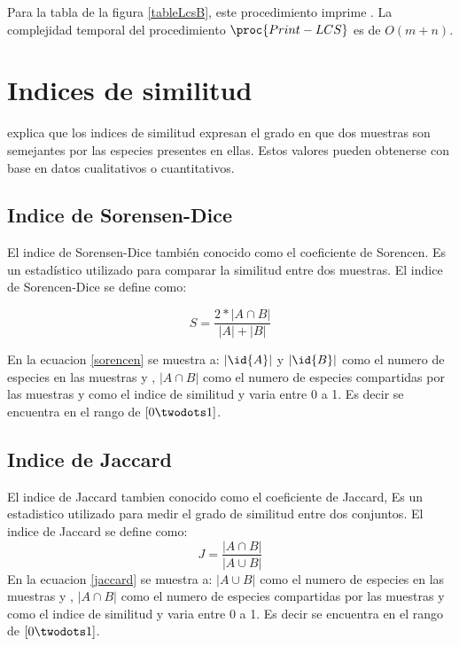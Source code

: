 

Para la tabla  de la figura \ref{tableLcsB}, este procedimiento imprime . La complejidad temporal del procedimiento $\proc{Print-LCS}$ es de $O(m + n)$.

\section{Indices de similitud}
\cite{magurran1988} explica que los indices de similitud expresan el grado en que dos muestras son semejantes por las especies presentes en ellas. Estos valores pueden obtenerse con base en datos cualitativos o cuantitativos.

\subsection{Indice de Sorensen-Dice}
El indice de Sorensen-Dice también conocido como el coeficiente de Sorencen. Es un estadístico utilizado para comparar la similitud entre dos muestras. El indice de Sorencen-Dice se define como:

\begin{equation}
S = \frac{2*|A \cap B|}{|A|+|B|}
\label{sorencen}
\end{equation}

En la ecuacion \ref{sorencen} se muestra a: $|\id{A}|$ y $|\id{B}|$ como el numero de especies en las muestras  y , $|A \cap B|$ como el numero de especies compartidas por las muestras y  como el indice de similitud y varia entre 0 a 1. Es decir se encuentra en el rango de $[0 \twodots 1]$.

\subsection{Indice de Jaccard}
El indice de Jaccard tambien conocido como el coeficiente de Jaccard, Es un estadistico utilizado para medir el grado de similitud entre dos conjuntos. El indice de Jaccard se define como:
\begin{equation}
J = \frac{|A \cap B|}{|A \cup B|}
\label{jaccard}
\end{equation}
En la ecuacion \ref{jaccard} se muestra a: $|A \cup B|$ como el numero de especies en las muestras  y , $|A \cap B|$ como el numero de especies compartidas por las muestras y  como el indice de similitud y varia entre 0 a 1. Es decir se encuentra en el rango de $[0 \twodots 1]$.
